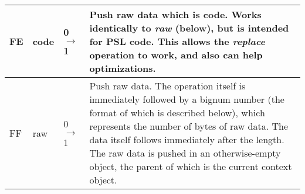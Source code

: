 \begin{longtable}{ | l | l | l | X | }
\hline
FE & code & 0 $\rightarrow$ 1 & Push raw data which is code. Works identically to \textit{raw} (below), but is intended for PSL code. This allows the \textit{replace} operation to work, and also can help optimizations. \\
\hline
FF & raw & 0 $\rightarrow$ 1 & Push raw data. The operation itself is immediately followed by a bignum number (the format of which is described below), which represents the number of bytes of raw data. The data itself follows immediately after the length. The raw data is pushed in an otherwise-empty object, the parent of which is the current context object. \\
\hline
\end{longtable}
